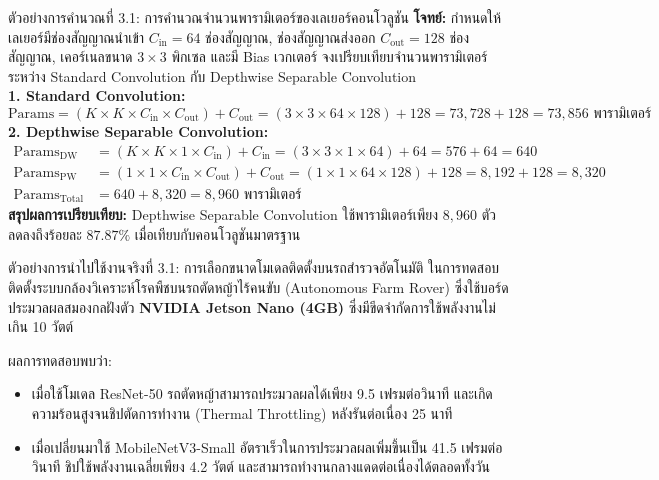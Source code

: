 \begin{examplebox}{ตัวอย่างการคำนวณที่ 3.1: การคำนวณจำนวนพารามิเตอร์ของเลเยอร์คอนโวลูชัน}
\textbf{โจทย์:} กำหนดให้เลเยอร์มีช่องสัญญาณนำเข้า $C_{\text{in}} = 64$ ช่องสัญญาณ, ช่องสัญญาณส่งออก $C_{\text{out}} = 128$ ช่องสัญญาณ, เคอร์เนลขนาด $3 \times 3$ พิกเซล และมี Bias เวกเตอร์ จงเปรียบเทียบจำนวนพารามิเตอร์ระหว่าง Standard Convolution กับ Depthwise Separable Convolution\\[4pt]
\textbf{1. Standard Convolution:}
\[
\text{Params} = (K \times K \times C_{\text{in}} \times C_{\text{out}}) + C_{\text{out}} = (3 \times 3 \times 64 \times 128) + 128 = 73,728 + 128 = 73,856 \text{ พารามิเตอร์}
\]
\textbf{2. Depthwise Separable Convolution:}
\begin{align*}
\text{Params}_{\text{DW}} &= (K \times K \times 1 \times C_{\text{in}}) + C_{\text{in}} = (3 \times 3 \times 1 \times 64) + 64 = 576 + 64 = 640 \\
\text{Params}_{\text{PW}} &= (1 \times 1 \times C_{\text{in}} \times C_{\text{out}}) + C_{\text{out}} = (1 \times 1 \times 64 \times 128) + 128 = 8,192 + 128 = 8,320 \\
\text{Params}_{\text{Total}} &= 640 + 8,320 = 8,960 \text{ พารามิเตอร์}
\end{align*}
\textbf{สรุปผลการเปรียบเทียบ:} Depthwise Separable Convolution ใช้พารามิเตอร์เพียง $8,960$ ตัว ลดลงถึงร้อยละ $87.87\%$ เมื่อเทียบกับคอนโวลูชันมาตรฐาน
\end{examplebox}

\begin{casestudybox}{ตัวอย่างการนำไปใช้งานจริงที่ 3.1: การเลือกขนาดโมเดลติดตั้งบนรถสำรวจอัตโนมัติ}
ในการทดสอบติดตั้งระบบกล้องวิเคราะห์โรคพืชบนรถตัดหญ้าไร้คนขับ (Autonomous Farm Rover) ซึ่งใช้บอร์ดประมวลผลสมองกลฝังตัว \textbf{NVIDIA Jetson Nano (4GB)} ซึ่งมีขีดจำกัดการใช้พลังงานไม่เกิน 10 วัตต์

ผลการทดสอบพบว่า:
\begin{itemize}[leftmargin=1.4em, itemsep=2pt]
    \item เมื่อใช้โมเดล ResNet-50 รถตัดหญ้าสามารถประมวลผลได้เพียง 9.5 เฟรมต่อวินาที และเกิดความร้อนสูงจนชิปตัดการทำงาน (Thermal Throttling) หลังรันต่อเนื่อง 25 นาที
    \item เมื่อเปลี่ยนมาใช้ MobileNetV3-Small อัตราเร็วในการประมวลผลเพิ่มขึ้นเป็น 41.5 เฟรมต่อวินาที ชิปใช้พลังงานเฉลี่ยเพียง 4.2 วัตต์ และสามารถทำงานกลางแดดต่อเนื่องได้ตลอดทั้งวัน
\end{itemize}
\end{casestudybox}

